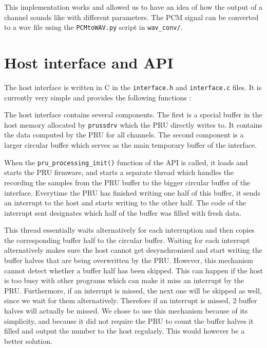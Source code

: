 \documentclass[]{report}
\begin{document}
This implementation works and allowed us to have an idea of how the
output of a channel sounds like with different parameters. The PCM
signal can be converted to a wav file using the \texttt{PCMtoWAV.py}
script in \texttt{wav\_conv/}.

\hypertarget{host-interface-and-api}{%
\section{Host interface and API}\label{host-interface-and-api}}

The host interface is written in C in the \texttt{interface.h} and
\texttt{interface.c} files. It is currently very simple and provides the
following functions :




The host interface contains several components. The first is a special
buffer in the host memory allocated by \texttt{prussdrv} which the PRU
directly writes to. It contains the data computed by the PRU for all
channels. The second component is a larger circular buffer which serves
as the main temporary buffer of the interface.

When the \texttt{pru\_processing\_init()} function of the API is called,
it loads and starts the PRU firmware, and starts a separate thread which
handles the recording the samples from the PRU buffer to the bigger
circular buffer of the interface. Everytime the PRU has finished writing
one half of this buffer, it sends an interrupt to the host and starts
writing to the other half. The code of the interrupt sent designates
which half of the buffer was filled with fresh data.

This thread essentially waits alternatively for each interruption and
then copies the corresponding buffer half to the circular buffer.
Waiting for each interrupt alternatively makes sure the host cannot get
desynchronized and start writing the buffer halves that are being
overwritten by the PRU. However, this mechanism cannot detect whether a
buffer half has been skipped. This can happen if the host is too busy
with other programs which can make it miss an interrupt by the PRU.
Furthermore, if an interrupt is missed, the next one will be skipped as
well, since we wait for them alternatively. Therefore if an interrupt is
missed, 2 buffer halves will actually be missed. We chose to use this
mechanism because of its simplicity, and because it did not require the
PRU to count the buffer halves it filled and output the number to the
host regularly. This would however be a better solution.
\end{document}
